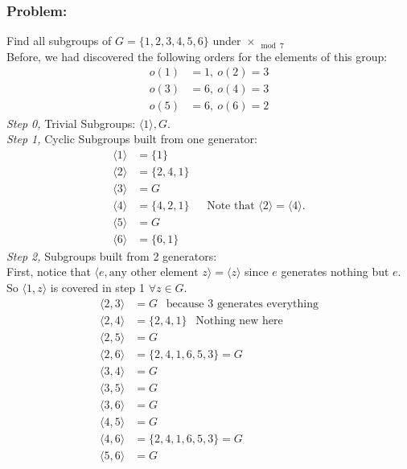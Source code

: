 \subsubsection{Problem:} Find all subgroups of $G=\{1,2,3,4,5,6\}$ under $\times_{\mod 7}$\\
Before, we had discovered the following orders for the elements of this group:
\begin{align}
    o(1)&=1, \ o(2)=3 \nonumber \\
    o(3)&=6, \ o(4)=3 \nonumber \\
    o(5)&=6, \ o(6)=2 \nonumber
\end{align}
\textit{Step 0,} Trivial Subgroups: $\langle 1 \rangle , G$.\\
\textit{Step 1,} Cyclic Subgroups built from one generator:
\begin{align}
    \langle 1 \rangle &= \{1\} \nonumber \\
    \langle 2 \rangle &= \{2,4,1\} \nonumber \\
    \langle 3 \rangle &= G \nonumber \\
    \langle 4 \rangle &= \{4,2,1\}  \ \ \ \ \ \ \ \text{Note that $\langle 2 \rangle=\langle 4 \rangle$.}\nonumber \\
    \langle 5 \rangle &= G \nonumber \\
    \langle 6 \rangle &= \{6,1\} \nonumber
\end{align}
\textit{Step 2,} Subgroups built from 2 generators:\\
First, notice that $\langle e, \text{any other element } z\rangle = \langle z\rangle$ since $e$
generates nothing but $e$. So $\langle 1, z\rangle$ is covered in step 1 $\forall z\in G$.
\begin{align}
    \langle 2,3 \rangle &= G \ \ \text{ because } 3 \text{ generates everything} \nonumber \\
    \langle 2,4 \rangle &= \{2,4,1\} \ \ \text{ Nothing new here} \nonumber \\
    \langle 2,5 \rangle &= G \nonumber \\
    \langle 2,6 \rangle &= \{2,4,1,6,5,3\}= G  \nonumber \\
    \langle 3,4 \rangle &= G \nonumber \\
    \langle 3,5 \rangle &= G \nonumber \\
    \langle 3,6 \rangle &= G \nonumber \\
    \langle 4,5 \rangle &= G \nonumber \\
    \langle 4,6 \rangle &= \{2,4,1,6,5,3\}= G \nonumber \\
    \langle 5,6 \rangle &= G \nonumber
\end{align}
